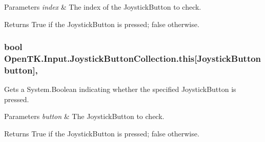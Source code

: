 \begin{DoxyParams}{Parameters}
{\em index} & The index of the Joystick\-Button to check.\\
\hline
\end{DoxyParams}
\begin{DoxyReturn}{Returns}
True if the Joystick\-Button is pressed; false otherwise.
\end{DoxyReturn}
\hypertarget{class_open_t_k_1_1_input_1_1_joystick_button_collection_affc23bad0bf45d348f621d77fc7340c0}{
\subsubsection[{this[Joystick\-Button button]}]{\setlength{\rightskip}{0pt plus 5cm}bool Open\-T\-K.\-Input.\-Joystick\-Button\-Collection.\-this\mbox{[}{\bf Joystick\-Button} button\mbox{]}\hspace{0.3cm}{\ttfamily [get]}, {\ttfamily [set]}}}\label{class_open_t_k_1_1_input_1_1_joystick_button_collection_affc23bad0bf45d348f621d77fc7340c0}


Gets a System.\-Boolean indicating whether the specified Joystick\-Button is pressed. 


\begin{DoxyParams}{Parameters}
{\em button} & The Joystick\-Button to check.\\
\hline
\end{DoxyParams}
\begin{DoxyReturn}{Returns}
True if the Joystick\-Button is pressed; false otherwise.
\end{DoxyReturn}
